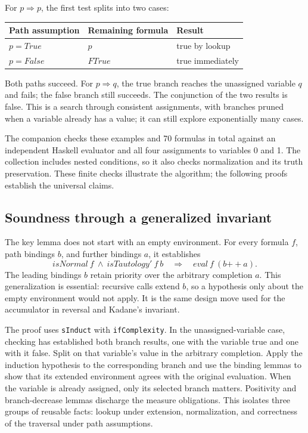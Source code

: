 \documentclass[review]{jfp-epi}
\newcommand{\code}[1]{\texttt{#1}}
\begin{document}
For $p\Rightarrow p$, the first test splits into two cases:
\begin{center}
\begin{tabular}{lll}
\toprule
Path assumption & Remaining formula & Result \\
\midrule
$p=\mathit{True}$  & $p$                & true by lookup \\
$p=\mathit{False}$ & $\mathit{FTrue}$   & true immediately \\
\bottomrule
\end{tabular}
\end{center}
Both paths succeed. For $p\Rightarrow q$, the true branch reaches the unassigned
variable $q$ and fails; the false branch still succeeds. The conjunction of the
two results is false. This is a search through consistent assignments, with
branches pruned when a variable already has a value; it can still explore
exponentially many cases.

The companion checks these examples and 70 formulas in total against an
independent Haskell evaluator and all four assignments to variables 0 and 1.
The collection includes nested conditions, so it also checks normalization and
its truth preservation. These finite checks illustrate the algorithm; the
following proofs establish the universal claims.

\subsection{Soundness through a generalized invariant}

The key lemma does not start with an empty environment. For every formula $f$,
path bindings $b$, and further bindings $a$, it establishes
\[
 \mathit{isNormal}\ f\ \land\ \mathit{isTautology'}\ f\ b
 \quad\Longrightarrow\quad \mathit{eval}\ f\ (b\mathbin{++}a).
\]
The leading bindings $b$ retain priority over the arbitrary completion $a$.
This generalization is essential: recursive calls extend $b$, so a hypothesis
only about the empty environment would not apply. It is the same design move
used for the accumulator in reversal and Kadane's invariant.

The proof uses \code{sInduct} with \code{ifComplexity}. In the unassigned-variable
case, checking has established both branch results, one with the variable true
and one with it false. Split on that variable's value in the arbitrary
completion. Apply the induction hypothesis to the corresponding branch and
use the binding lemmas to show that its extended environment agrees with the
original evaluation. When the variable is already assigned, only its selected
branch matters. Positivity and branch-decrease lemmas discharge the measure
obligations. This isolates three groups of reusable facts: lookup under extension,
normalization, and correctness of the traversal under path assumptions.
\end{document}
